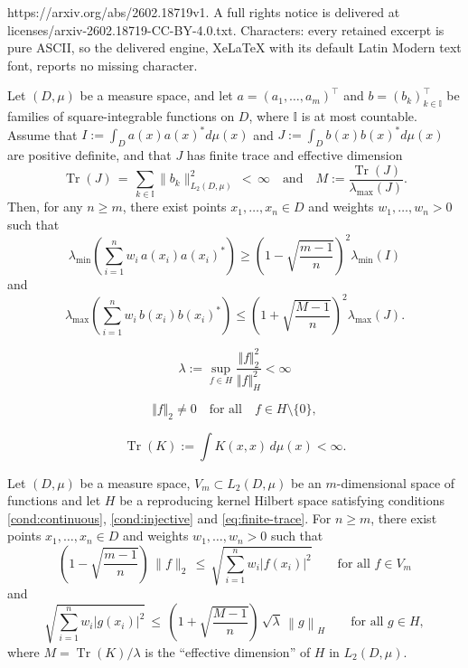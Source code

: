 \documentclass[10pt,a4paper]{amsart}
\DeclareMathOperator{\Tr}{Tr}
\begin{document}
https://arxiv.org/abs/2602.18719v1. A full rights notice is delivered at licenses/arxiv-2602.18719-CC-BY-4.0.txt. Characters: every retained excerpt is pure ASCII, so the delivered engine, XeLaTeX with its default Latin Modern text font, reports no missing character.
\begin{theorem}
\label{thm:main}
Let $(D,\mu)$ be a measure space, and let $a=(a_1,\hdots,a_m)^\top$
and $b= (b_k)_{k\in \mathbb I}^\top$ be families of square-integrable functions on $D$,
where $\mathbb I$ is at most countable.
Assume that $I:=\int_D a(x)a(x)^*d\mu(x)$ and $J:=\int_D b(x)b(x)^*d\mu(x)$ are positive definite, and that $J$
has finite trace and effective dimension
\[
\Tr(J) \,=\, \sum_{k\in \mathbb I} \|b_k\|_{L_2(D,\mu)}^2 \,<\,\infty
\quad\text{and}\quad M:=\frac{\Tr(J)}{\lambda_{\max}(J)}.
\]
Then, for any
$n\geq m$, there exist points $x_1,\dots,x_n\in D$ and weights ${w_1,\dots,w_n>0}$ such that
\[
\lambda_{\min}\left( \sum_{i=1}^{n} w_i\, 
a(x_i)a(x_i)^* \right) \geq
\left(1-\sqrt{\frac{m-1}{n}}\right)^2
\lambda_{\min}(I)
\]
and
\[
\lambda_{\max}\left(\sum_{i=1}^{n} w_i\, b(x_i)b(x_i)^* \right) \leq \left(1+\sqrt{\frac{M-1}{n}}\right)^2
\lambda_{\max}(J).
\]
\end{theorem}

\begin{equation}\label{cond:continuous}
\lambda:=\sup_{f\in H} \frac{\Vert f \Vert_2^2}{\Vert f \Vert_H^2}<\infty
\end{equation}

\begin{equation}\label{cond:injective}
 \Vert f \Vert_2 \ne 0
 \quad \text{for all} \quad f\in H \setminus \{0\},
\end{equation}

\begin{equation}\label{eq:finite-trace}
 \Tr(K) := \int K(x,x)\,d\mu(x) < \infty.
\end{equation}

\begin{coro} \label{coro:main}
Let $(D,\mu)$ be a measure space, 
$V_m\subset L_2(D,\mu)$ be an $m$-dimensional space of functions and let $H$ be 
a reproducing kernel Hilbert space satisfying conditions \eqref{cond:continuous}, \eqref{cond:injective} and \eqref{eq:finite-trace}. 
For $n\geq m$, there exist points $x_1,\dots,x_n\in D$ and weights ${w_1,\dots,w_n>0}$ such that
\begin{equation}
\label{eq-low-coro-main}
\left(1-\sqrt{\frac{m-1}{n}}\right)\,\|f\|_2
\,\leq\,
\sqrt{\sum_{i=1}^n w_i|f(x_i)|^2}
\qquad \text{for all } f \in V_m
\end{equation}
and 
\begin{equation}
\label{eq-up-coro-main}
\sqrt{\sum_{i=1}^n w_i|g(x_i)|^2}
\,\leq\,
\left(1 +\sqrt{\frac{M-1}{n}} \right)\, \sqrt\lambda\,
\left\| g \right\|_H
\qquad \text{for all } g \in H,
\end{equation}
where $M=\Tr(K)/\lambda$ is the ``effective dimension'' of $H$ in $L_2(D,\mu)$.
\end{coro}
\end{document}
